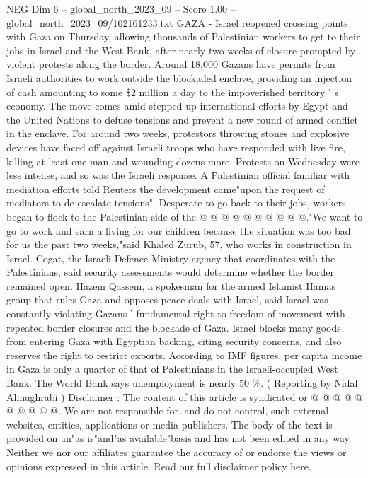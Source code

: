 \begin{textsample}{NEG Dim 6 – global\_north\_2023\_09 – Score 1.00 – global\_north\_2023\_09/102161233.txt}  \label{ex:f6_neg_339}
GAZA - Israel reopened crossing points with Gaza on Thursday, allowing thousands of Palestinian workers to get to their jobs in Israel and the West Bank, after nearly two weeks of closure prompted by violent protests along the border.
Around 18,000 Gazans have permits from Israeli authorities to work outside the blockaded enclave, providing an injection of cash amounting to some \$2 million a day to the impoverished territory ' s economy.
The move comes amid stepped-up international efforts by Egypt and the United Nations to defuse tensions and prevent a new round of armed conflict in the enclave.
For around two weeks, protestors throwing stones and explosive devices have faced off against Israeli troops who have responded with live fire, killing at least one man and wounding dozens more.
Protests on Wednesday were less intense, and so was the Israeli response.
A Palestinian official familiar with mediation efforts told Reuters the development came"upon the request of mediators to de-escalate tensions".
Desperate to go back to their jobs, workers began to flock to the Palestinian side of the @ @ @ @ @ @ @ @ @ @."We want to go to work and earn a living for our children because the situation was too bad for us the past two weeks,"said Khaled Zurub, 57, who works in construction in Israel.
Cogat, the Israeli Defence Ministry agency that coordinates with the Palestinians, said security assessments would determine whether the border remained open.
Hazem Qassem, a spokesman for the armed Islamist Hamas group that rules Gaza and opposes peace deals with Israel, said Israel was constantly violating Gazans ' fundamental right to freedom of movement with repeated border closures and the blockade of Gaza.
Israel blocks many goods from entering Gaza with Egyptian backing, citing security concerns, and also reserves the right to restrict exports.
According to IMF figures, per capita income in Gaza is only a quarter of that of Palestinians in the Israeli-occupied West Bank.
The World Bank says unemployment is nearly 50 \%. ( Reporting by Nidal Almughrabi ) Disclaimer : The content of this article is syndicated or @ @ @ @ @ @ @ @ @ @.
We are not responsible for, and do not control, such external websites, entities, applications or media publishers.
The body of the text is provided on an"as is"and"as available"basis and has not been edited in any way.
Neither we nor our affiliates guarantee the accuracy of or endorse the views or opinions expressed in this article.
Read our full disclaimer policy here.

\end{textsample}
